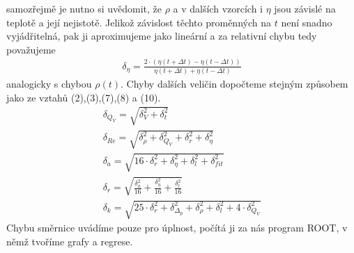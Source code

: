 \documentclass[a4paper]{article}
\begin{document}
samozřejmě je nutno si uvědomit, že $\rho$ a v dalších vzorcích i $\eta$ jsou závislé na teplotě a její nejistotě. Jelikož závislost těchto proměnných na $t$ není snadno vyjádřitelná, pak ji aproximujeme jako lineární a za relativní chybu tedy považujeme
\begin{align}
\delta_{\eta} = \frac{2 \cdot (\eta(t+\Delta t) - \eta(t-\Delta t))}{\eta(t+\Delta t) + \eta(t-\Delta t)}
\end{align}
analogicky s chybou $\rho(t)$. Chyby dalších veličin dopočteme stejným způsobem jako ze vztahů (2),(3),(7),(8) a (10).
\begin{align}
\delta_{Q_{V}} = \sqrt{\delta^{2}_{V} + \delta^{2}_{t}}\\
\delta_{Re} = \sqrt{\delta^{2}_{\rho} + \delta^{2}_{Q_{V}} + \delta^{2}_{r} + \delta^{2}_{\eta}}\\
\delta_{a} = \sqrt{16 \cdot \delta^{2}_{r} + \delta^{2}_{\eta} + \delta^{2}_{l} + \delta^{2}_{fit}}\\
\delta_{r} = \sqrt{{\frac{\delta^{2}_{a}}{16}} + {\frac{\delta^{2}_{\eta}}{16}} + {\frac{\delta^{2}_{l}}{16}}} \\
\delta_{k} = \sqrt{25 \cdot \delta^{2}_{r} + \delta^{2}_{\Delta_{p}} + \delta^{2}_{\rho} + \delta^{2}_{l} + 4 \cdot \delta^{2}_{Q_{V}}}
\end{align}
Chybu směrnice uvádíme pouze pro úplnost, počítá ji za nás program ROOT, v němž tvoříme grafy a regrese.
\end{document}
